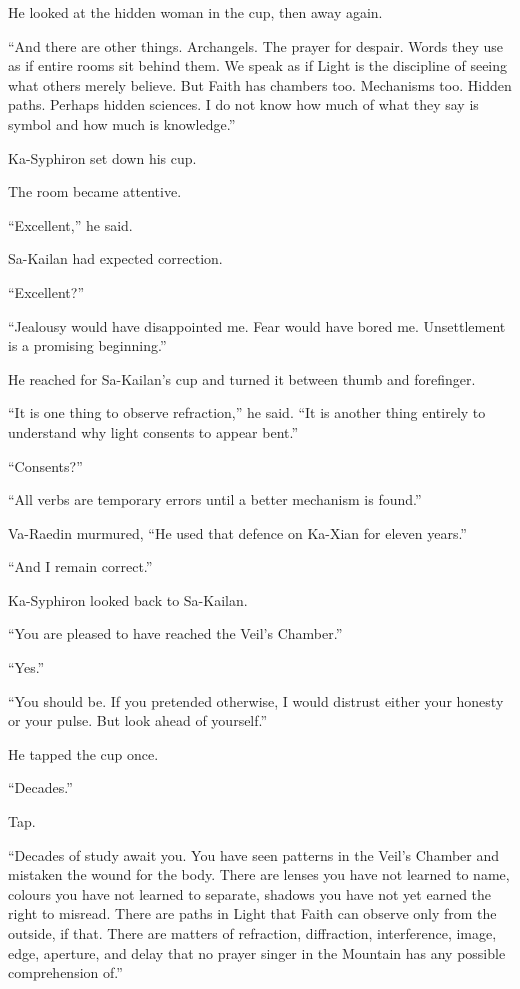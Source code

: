 He looked at the hidden woman in the cup, then away again.\par
“And there are other things. Archangels. The prayer for despair. Words they use as if entire rooms sit behind them. We speak as if Light is the discipline of seeing what others merely believe. But Faith has chambers too. Mechanisms too. Hidden paths. Perhaps hidden sciences. I do not know how much of what they say is symbol and how much is knowledge.”\par
Ka-Syphiron set down his cup.\par
The room became attentive.\par
“Excellent,” he said.\par
Sa-Kailan had expected correction.\par
“Excellent?”\par
“Jealousy would have disappointed me. Fear would have bored me. Unsettlement is a promising beginning.”\par
He reached for Sa-Kailan’s cup and turned it between thumb and forefinger.\par
“It is one thing to observe refraction,” he said. “It is another thing entirely to understand why light consents to appear bent.”\par
“Consents?”\par
“All verbs are temporary errors until a better mechanism is found.”\par
Va-Raedin murmured, “He used that defence on Ka-Xian for eleven years.”\par
“And I remain correct.”\par
Ka-Syphiron looked back to Sa-Kailan.\par
“You are pleased to have reached the Veil’s Chamber.”\par
“Yes.”\par
“You should be. If you pretended otherwise, I would distrust either your honesty or your pulse. But look ahead of yourself.”\par
He tapped the cup once.\par
“Decades.”\par
Tap.\par
“Decades of study await you. You have seen patterns in the Veil’s Chamber and mistaken the wound for the body. There are lenses you have not learned to name, colours you have not learned to separate, shadows you have not yet earned the right to misread. There are paths in Light that Faith can observe only from the outside, if that. There are matters of refraction, diffraction, interference, image, edge, aperture, and delay that no prayer singer in the Mountain has any possible comprehension of.”\par
